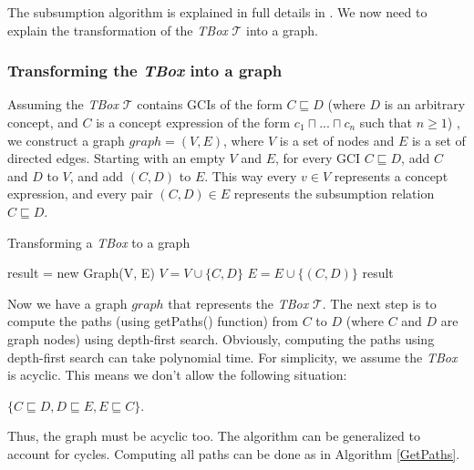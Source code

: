 The subsumption algorithm is explained in full details in \cite{new}. We now need to explain the transformation of the \textit{TBox} $\mathcal{T}$ into a graph.

\subsubsection{Transforming the \textit{TBox} into a graph}
Assuming the \textit{TBox} $\mathcal{T}$ contains GCIs of the form $C \sqsubseteq D$ (where $D$ is an arbitrary concept, and $C$ is a concept expression of the form $c_1 \sqcap ... \sqcap c_n$ such that $n \geq 1$) , we construct a graph $graph=(V, E)$, where $V$ is a set of nodes and $E$ is a set of directed edges. Starting with an empty $V$ and $E$, for every GCI $C \sqsubseteq D$, add $C$ and $D$ to $V$, and add $(C, D)$ to $E$. This way every $v \in V$ represents a concept expression, and every pair $(C, D) \in E$ represents the subsumption relation $C \sqsubseteq D$.

\begin{algorithm}
\caption{Transforming a \textit{TBox} to a graph}
\label{Transformation}
\begin{algorithmic}[1]
\State result = new Graph(V, E)
\State $V = V \cup \{C, D\}$
\State $E = E \cup \{(C, D)\}$
\EndFor
\State \Return result
\EndFunction
\end{algorithmic}
\end{algorithm}

Now we have a graph $graph$ that represents the \textit{TBox} $\mathcal{T}$. The next step is to compute the paths (using getPaths() function) from $C$ to $D$ (where $C$ and $D$ are graph nodes) using depth-first search. Obviously, computing the paths using depth-first search can take polynomial time. For simplicity, we assume the \textit{TBox} is acyclic. This means we don't allow the following situation:
\begin{center}
$\lbrace C \sqsubseteq D , D \sqsubseteq E , E \sqsubseteq C \rbrace$.
\end{center}
Thus, the graph must be acyclic too. The algorithm can be generalized to account for cycles. Computing all paths can be done as in Algorithm \ref{GetPaths}.

